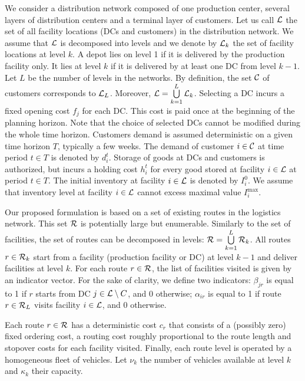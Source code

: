 \documentclass[a4paper,10pt]{article}
\begin{document}
\begin{linenumbers}
We consider a distribution network composed of one production center, several layers of distribution centers and a terminal layer of customers. Let us call $\mathcal{L}$ the set of all facility locations (DCs and customers) in the distribution network. 
We assume that $\mathcal{L}$ is decomposed into levels and we denote by $\mathcal{L}_k$ the set of facility locations at level $k$. 
A depot lies on level 1 if it is delivered by the production facility only. 
It lies at level $k$ if it is delivered by at least one DC from level $k-1$. 
Let $L$ be the number of levels in the networks. By definition, the set $\mathcal{C}$ of customers corresponds to $\mathcal{L}_L$.
Moreover, $\mathcal{L}=\bigcup\limits_{k=1}^L \mathcal{L}_k$.
%
Selecting a DC incurs a fixed opening cost $f_j$ for each DC. 
This cost is paid once at the beginning of the planning horizon. 
Note that the choice of selected DCs cannot be modified during the whole time horizon. 
%
Customers demand is assumed deterministic on a given time horizon $T$, typically a few weeks. The demand of customer $i \in \mathcal{C}$ at time period $t\in T$ is denoted by $d^t_i$.
%
Storage of goods at DCs and customers is authorized, 
but incurs a holding cost $h^t_i$ for every good stored at facility $i \in \mathcal{L}$ at period $t \in T$.
The initial inventory at facility $i \in \mathcal{L}$ is denoted by $I_i^0$. 
We assume that inventory level at facility $i \in \mathcal{L}$ cannot excess maximal value $I_i^{\max}$. 

Our proposed formulation is based on a set of existing routes in the logistics network. 
This set $\mathcal{R}$ is potentially large but enumerable. 
Similarly to the set of facilities, the set of routes can be decomposed in levels: $\mathcal{R} = \bigcup\limits_{k=1}^{L} \mathcal{R}_k$. 
All routes $r \in \mathcal{R}_k$ start from a facility (production facility or DC) at level $k-1$ and deliver facilities at level $k$. 
For each route $r \in \mathcal{R}$, the list of facilities visited is given by an indicator vector. 
For the sake of clarity, we define two indicators: 
$\beta_{jr}$ is equal to 1 if $r$ starts from DC $j \in \mathcal{L} \setminus C$, and 0 otherwise;
$\alpha_{ir}$ is equal to 1 if route $r \in \mathcal{R}_{L}$ visits facility $i \in \mathcal{L}$, and 0 otherwise.
%

Each route 	$r\in \mathcal{R}$ has a deterministic cost $c_r$ that consists of a (possibly zero) fixed ordering cost, 
a routing cost roughly proportional to the route length and stopover costs for each facility visited.  
Finally, each route level is operated by a homogeneous fleet of vehicles. 
Let $\nu_k$ the number of vehicles available at level $k$ and $\kappa_k$ their capacity. 
%




\end{linenumbers}
\end{document}
